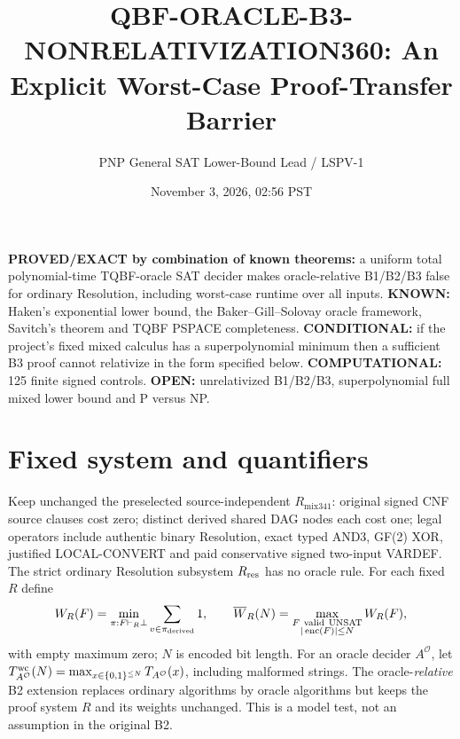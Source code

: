 \documentclass[11pt]{article}
\title{QBF-ORACLE-B3-NONRELATIVIZATION360: An Explicit Worst-Case Proof-Transfer Barrier}
\author{PNP General SAT Lower-Bound Lead / LSPV-1}
\date{November 3, 2026, 02:56 PST}
\begin{document}
\maketitle
\noindent\textbf{PROVED/EXACT by combination of known theorems:} a uniform total polynomial-time TQBF-oracle SAT decider makes oracle-relative B1/B2/B3 false for ordinary Resolution, including worst-case runtime over all inputs. \textbf{KNOWN:} Haken's exponential lower bound, the Baker--Gill--Solovay oracle framework, Savitch's theorem and TQBF PSPACE completeness. \textbf{CONDITIONAL:} if the project's fixed mixed calculus has a superpolynomial minimum then a sufficient B3 proof cannot relativize in the form specified below. \textbf{COMPUTATIONAL:} 125 finite signed controls. \textbf{OPEN:} unrelativized B1/B2/B3, superpolynomial full mixed lower bound and P versus NP.

\section*{Fixed system and quantifiers}
Keep unchanged the preselected source-independent $R_{\mathrm{mix341}}$: original signed CNF source clauses cost zero; distinct derived shared DAG nodes each cost one; legal operators include authentic binary Resolution, exact typed AND3, GF(2) XOR, justified LOCAL-CONVERT and paid conservative signed two-input VARDEF. The strict ordinary Resolution subsystem $R_{\rm res}$ has no oracle rule. For each fixed $R$ define
\[
W_R(F)=\min_{\pi:F\vdash_R\bot}\sum_{v\in\pi_{\rm derived}}1,\qquad
\overline W_R(N)=\max_{\substack{F\ {\rm valid\ UNSAT}\\|\operatorname{enc}(F)|\le N}}W_R(F),
\]
with empty maximum zero; $N$ is encoded bit length. For an oracle decider $A^{\mathcal O}$, let $T_{A^{\mathcal O}}^{\rm wc}(N)=\max_{x\in\{0,1\}^{\le N}}T_{A^{\mathcal O}}(x)$, including malformed strings. The oracle-\emph{relative} B2 extension replaces ordinary algorithms by oracle algorithms but keeps the proof system $R$ and its weights unchanged. This is a model test, not an assumption in the original B2.
\end{document}
